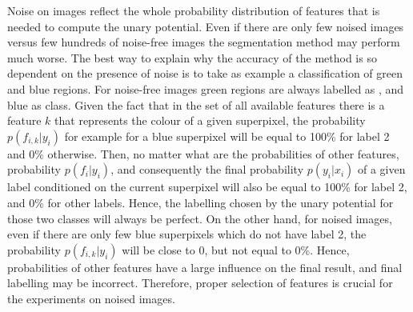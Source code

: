 Noise on images reflect the whole probability distribution of features that is needed to compute the unary potential. Even if there are only few noised images versus few hundreds of noise-free images the segmentation method may perform much worse. The best way to explain why the accuracy of the method is so dependent on the presence of noise is to take as example a classification of green and blue regions. For noise-free images green regions are always labelled as , and blue as  class. Given the fact that in the set of all available features there is a feature $k$ that represents the colour of a given superpixel, the  probability $p(f_{i,k}|y_i)$ for example for a blue superpixel will be equal to 100\% for label 2 and 0\% otherwise. Then, no matter what are the probabilities of other features, probability $p(f_i|y_i)$, and consequently the final probability $p(y_i|x_i)$ of a given label conditioned on the current superpixel will also be equal to 100\% for label 2, and 0\% for other labels. Hence, the labelling chosen by the unary potential for those two classes will always be perfect. On the other hand, for noised images, even if there are only few blue superpixels which do not have label 2, the probability $p(f_{i,k}|y_i)$ will be close to 0, but not equal to 0\%. Hence, probabilities of other features have a large influence on the final result, and final labelling may be incorrect. Therefore, proper selection of features is crucial for the experiments on noised images.  

